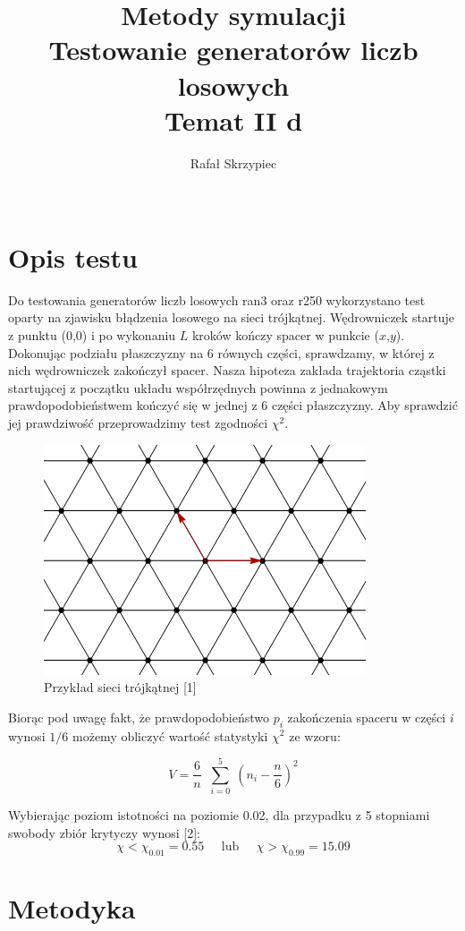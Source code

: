 \documentclass[]{scrartcl}
\title{Metody symulacji \\ \normalsize{Testowanie generatorów liczb losowych \\ Temat II d}}
\date{}
\author{ Rafał Skrzypiec \\ \normalsize{\text{263957}}\\}
\begin{document}
	
	\maketitle


\section*{Opis testu}



Do testowania generatorów liczb losowych ran3 oraz r250 wykorzystano test oparty na zjawisku błądzenia losowego na sieci trójkątnej. Wędrowniczek startuje z punktu (0,0) i po wykonaniu $L$ kroków kończy spacer w punkcie ($x$,$y$). Dokonując podziału płaszczyzny na 6 równych części, sprawdzamy, w której z nich wędrowniczek zakończył spacer.
Nasza hipoteza zakłada trajektoria cząstki startującej z początku układu współrzędnych powinna z jednakowym prawdopodobieństwem kończyć się w jednej z 6 części płaszczyzny. Aby sprawdzić jej prawdziwość przeprowadzimy test zgodności $\chi^2$.


\begin{figure}[!h]
	\centering
	\includegraphics[width=0.5\linewidth]{hexagonal}
	\caption{Przykład sieci trójkątnej [1]}
\end{figure}

Biorąc pod uwagę fakt, że prawdopodobieństwo $p_i$ zakończenia spaceru w części $i$ wynosi $1/6$ możemy obliczyć wartość statystyki $\chi^2$ ze wzoru:

$$
V = \frac{6}{n}\;\; \sum_{i = 0}^{5}\;\left( n_i - \frac{n}{6}  \right)^2
$$

Wybierając poziom istotności na poziomie 0.02, dla przypadku z 5 stopniami swobody zbiór krytyczy wynosi [2]:
$$
\chi < \chi_{0.01} = 0.55 \;\;\;\;\; \text{lub} \;\;\;\;\; \chi > \chi_{0.99} = 15.09
$$


\clearpage

\section*{Metodyka}
\end{document}
